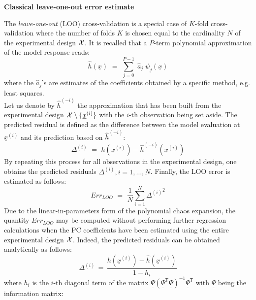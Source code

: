 {  
  \textbf{Classical leave-one-out error estimate} \vspace{2mm}

  The \emph{leave-one-out} (LOO) cross-validation is a special case of $K$-fold cross-validation where the number of folds $K$ is chosen equal to the cardinality $N$ of the experimental design ${\mathcal X}$. It is recalled that a $P$-term polynomial approximation of the model response reads:
  \begin{equation}
    \widehat{h}(\underline{x}) \, \, = \, \,  \sum_{j=0}^{P-1} \; \widehat{a}_{j} \; \psi_{j}(\underline{x})
  \end{equation}
  where the $\widehat{a}_{j}$'s are estimates of the coefficients obtained by a specific method, e.g. least squares. \\
  Let us denote by $\widehat{h}^{(-i)}$ the approximation that has been built from the experimental design ${\mathcal X} \setminus \{\underline{x}^{(i)}\}$ with the $i$-th observation being set aside. The predicted residual is defined as the difference between the model evaluation at $\underline{x}^{(i)}$ and its prediction based on $\widehat{h}^{(-i)}$:
  \begin{equation} \label{eq:4.3:5}
    \Delta^{(i)} \, \, = \, \,  h(\underline{x}^{(i)}) - \widehat{h}^{(-i)}(\underline{x}^{(i)})
  \end{equation}
  By repeating this process for all observations in the experimental design, one obtains the predicted residuals $\Delta^{(i)}, i = 1, \dots , N$. Finally, the LOO error is estimated as follows:
  \begin{equation}\label{eq:4.3:6}
    Err_{LOO} \, \, = \, \, \frac{1}{N} \sum_{i=1}^{N} {\Delta^{(i)}}^{2}
  \end{equation}
  Due to the linear-in-parameters form of the polynomial chaos expansion, the quantity $Err_{LOO}$ may be computed without performing further regression calculations when the PC coefficients have been estimated using the entire experimental design ${\mathcal X}$. Indeed, the predicted residuals can be obtained analytically as follows:
  \begin{equation} \label{eq:4.3:7}
    \Delta^{(i)} \, = \,
    \frac{h(\underline{x}^{(i)}) - \widehat{h}(\underline{x}^{(i)})}{1 - h_i}
  \end{equation}
  where $h_i$ is the $i$-th diagonal term of the matrix $\underline{\underline{\Psi}} (\underline{\underline{\Psi}}^{\textsf{T}}\underline{\underline{\Psi}})^{-1} \underline{\underline{\Psi}}^{\textsf{T}}$ with $\underline{\underline{\Psi}}$ being the information matrix:
}
